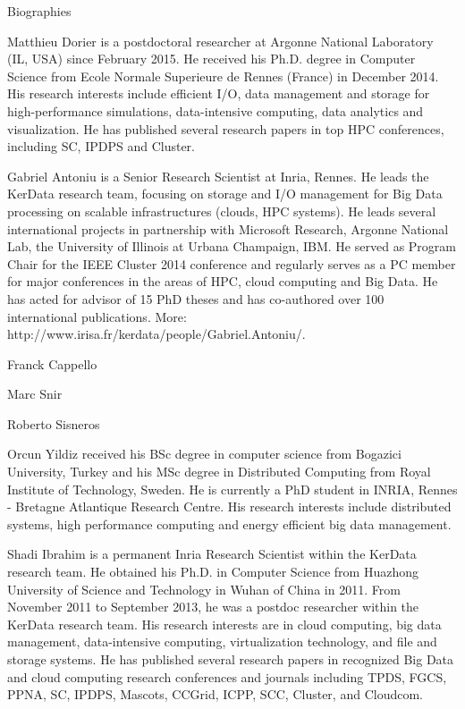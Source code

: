 Biographies

Matthieu Dorier is a postdoctoral researcher at Argonne National Laboratory (IL, USA) since February 2015. He received his Ph.D. degree in Computer Science from Ecole Normale Superieure de Rennes (France) in December 2014. His research interests include efficient I/O, data management and storage for high-performance simulations, data-intensive computing, data analytics and visualization. He has published several research papers in top HPC conferences, including SC, IPDPS and Cluster.

Gabriel Antoniu is a Senior Research Scientist at Inria, Rennes. He leads the KerData research team, focusing on storage and I/O management for Big Data processing on scalable infrastructures (clouds, HPC systems). He leads several international projects in partnership with Microsoft Research, Argonne National Lab, the University of Illinois at Urbana Champaign, IBM. He served as Program Chair for the IEEE Cluster 2014 conference and regularly serves as a PC member for major conferences in the areas of HPC, cloud computing and Big Data. He has acted for advisor of 15 PhD theses and has co-authored over 100 international publications. More: http://www.irisa.fr/kerdata/people/Gabriel.Antoniu/.

Franck Cappello

Marc Snir

Roberto Sisneros

Orcun Yildiz received his BSc degree in computer science from Bogazici University, Turkey and his MSc degree in Distributed Computing from Royal Institute of Technology, Sweden. He is currently a PhD student in INRIA, Rennes - Bretagne Atlantique Research Centre. His research interests include distributed systems, high performance computing and energy efficient big data management.

Shadi Ibrahim is a permanent Inria Research Scientist within the KerData research team. He obtained his Ph.D. in Computer Science from Huazhong University of Science and Technology in Wuhan of China in 2011. From November 2011 to September 2013, he was a postdoc researcher within the KerData research team. His research interests are in cloud computing, big data management, data-intensive computing, virtualization technology, and file and storage systems. He has published several research papers in recognized Big Data and cloud computing research conferences and journals including TPDS, FGCS, PPNA, SC, IPDPS, Mascots, CCGrid, ICPP, SCC, Cluster, and Cloudcom.

